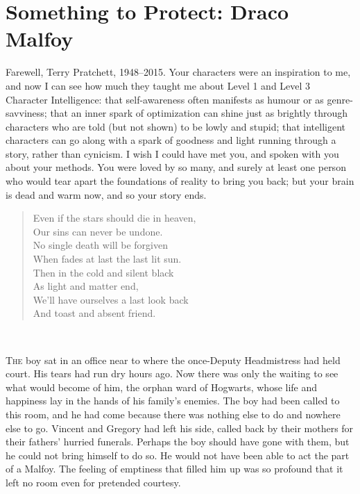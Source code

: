 \chapter{Something to Protect: Draco Malfoy}

\begin{chapterOpeningAuthorNote}
Farewell, Terry Pratchett, 1948–2015. Your characters were an inspiration to me, and now I can see how much they taught me about Level 1 and Level 3 Character Intelligence: that self-awareness often manifests as humour or as genre-savviness; that an inner spark of optimization can shine just as brightly through characters who are told (but not shown) to be lowly and stupid; that intelligent characters can go along with a spark of goodness and light running through a story, rather than cynicism. I wish I could have met you, and spoken with you about your methods. You were loved by so many, and surely at least one person who would tear apart the foundations of reality to bring you back; but your brain is dead and warm now, and so your story ends.
\begin{verse}
Even if the stars should die in heaven, \\
Our sins can never be undone. \\
No single death will be forgiven \\
When fades at last the last lit sun. \\
Then in the cold and silent black \\
As light and matter end, \\
We’ll have ourselves a last look back \\
And toast and absent friend. \\
\end{verse}
~
\end{chapterOpeningAuthorNote}

\lettrine{T}{he} boy sat in an office near to where the once-Deputy Headmistress had held court. His tears had run dry hours ago. Now there was only the waiting to see what would become of him, the orphan ward of Hogwarts, whose life and happiness lay in the hands of his family’s enemies. The boy had been called to this room, and he had come because there was nothing else to do and nowhere else to go. Vincent and Gregory had left his side, called back by their mothers for their fathers’ hurried funerals. Perhaps the boy should have gone with them, but he could not bring himself to do so. He would not have been able to act the part of a Malfoy. The feeling of emptiness that filled him up was so profound that it left no room even for pretended courtesy.

